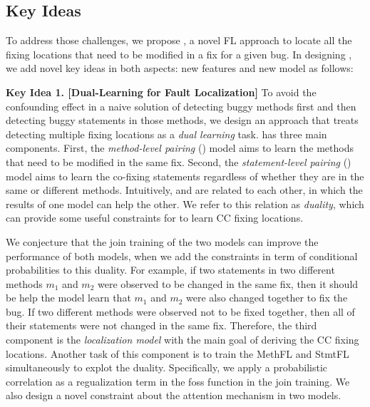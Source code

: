 \subsection{Key Ideas}
\label{sec:key-ideas}

To address those challenges, we propose {\tool}, a novel FL approach
to locate all the fixing locations that need to be modified in a fix
for a given bug. In designing {\tool}, we add novel key ideas in both
aspects: new features and new model as follows:

{\bf Key Idea 1. [Dual-Learning for Fault Localization]} To avoid the
confounding effect in a naive solution of detecting buggy methods
first and then detecting buggy statements in those methods, we design
an approach that treats detecting multiple fixing locations as a {\em
  dual learning} task. {\tool} has three main components. First, the
{\em method-level pairing} () model aims to learn the
methods that need to be modified in the same fix. Second, the {\em
  statement-level pairing} () model aims to learn the
co-fixing statements regardless of whether they are in the same or
different methods. Intuitively,  and  are
related to each other, in which the results of one model can help the
other. We refer to this relation as {\em duality}, which can provide
some useful constraints for {\tool} to learn CC fixing locations.

We conjecture that the join training of the two models can improve the
performance of both models, when we add the constraints in term of
conditional probabilities to this duality. For example, if two
statements in two different methods $m_1$ and $m_2$ were observed to
be changed in the same fix, then it should be help the model learn
that $m_1$ and $m_2$ were also changed together to fix the bug.  If
two different methods were observed not to be fixed together, then all
of their statements were not changed in the same fix. Therefore, the
third component is the {\em localization model} with the main goal of
deriving the CC fixing locations. Another task of this component is to
train the MethFL and StmtFL simultaneously to explot the
duality. Specifically, we apply a probabilistic correlation as a
regualization term in the foss function in the join training. We also
design a novel constraint about the attention mechanism in two models.





